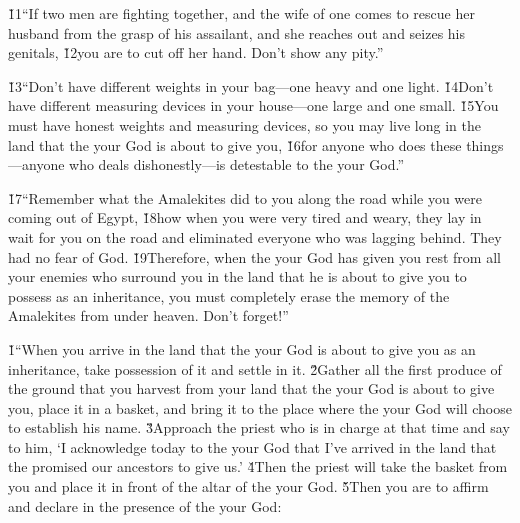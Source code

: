 \v{11}``If two men are fighting together, and the wife of one comes to rescue her husband from the grasp of his assailant, and she reaches out and seizes his genitals, \v{12}you are to cut off her hand. Don't show any pity.''

\v{13}``Don't have different weights in your bag---one heavy and one light. \v{14}Don't have different measuring devices in your house---one large and one small. \v{15}You must have honest weights and measuring devices, so you may live long in the land that the  your God is about to give you, \v{16}for anyone who does these things---anyone who deals dishonestly---is detestable to the  your God.''

\v{17}``Remember what the Amalekites did to you along the road while you were coming out of Egypt, \v{18}how when you were very tired and weary, they lay in wait for you on the road and eliminated everyone who was lagging behind. They had no fear of God. \v{19}Therefore, when the  your God has given you rest from all your enemies who surround you in the land that he is about to give you to possess as an inheritance, you must completely erase the memory of the Amalekites from under heaven. Don't forget!''

\v{1}``When you arrive in the land that the  your God is about to give you as an inheritance, take possession of it and settle in it. \v{2}Gather all the first produce of the ground that you harvest from your land that the  your God is about to give you, place it in a basket, and bring it to the place where the  your God will choose to establish his name. \v{3}Approach the priest who is in charge at that time and say to him, `I acknowledge today to the  your God that I've arrived in the land that the  promised our ancestors to give us.' \v{4}Then the priest will take the basket from you and place it in front of the altar of the  your God. \v{5}Then you are to affirm and declare in the presence of the  your God:

